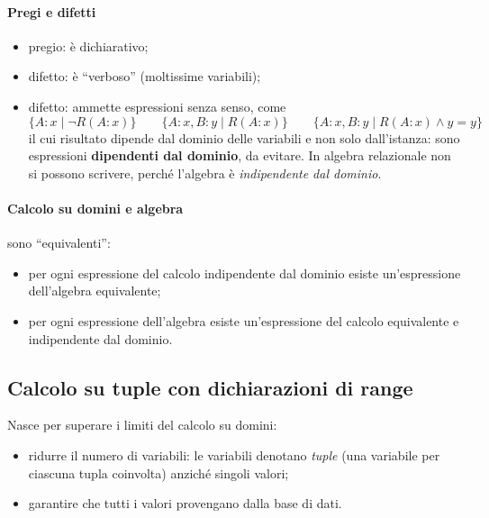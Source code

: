 \documentclass[a4paper,12pt]{article}
\begin{document}
\paragraph{Pregi e difetti}
\begin{itemize}
  \item pregio: è dichiarativo;
  \item difetto: è ``verboso'' (moltissime variabili);
  \item difetto: ammette espressioni senza senso, come
    \[ \{ A: x \mid \neg R(A: x) \} \qquad
       \{ A: x, B: y \mid R(A: x) \} \qquad
       \{ A: x, B: y \mid R(A: x) \wedge y = y \} \]
    il cui risultato dipende dal dominio delle variabili e non solo
    dall'istanza: sono espressioni \textbf{dipendenti dal dominio}, da evitare.
    In algebra relazionale non si possono scrivere, perché l'algebra è
    \emph{indipendente dal dominio}.
\end{itemize}

\paragraph{Calcolo su domini e algebra} sono ``equivalenti'':
\begin{itemize}
  \item per ogni espressione del calcolo indipendente dal dominio esiste
    un'espressione dell'algebra equivalente;
  \item per ogni espressione dell'algebra esiste un'espressione del calcolo
    equivalente e indipendente dal dominio.
\end{itemize}

\subsection{Calcolo su tuple con dichiarazioni di range}

Nasce per superare i limiti del calcolo su domini:
\begin{itemize}
  \item ridurre il numero di variabili: le variabili denotano \emph{tuple}
    (una variabile per ciascuna tupla coinvolta) anziché singoli valori;
  \item garantire che tutti i valori provengano dalla base di dati.
\end{itemize}
\end{document}
